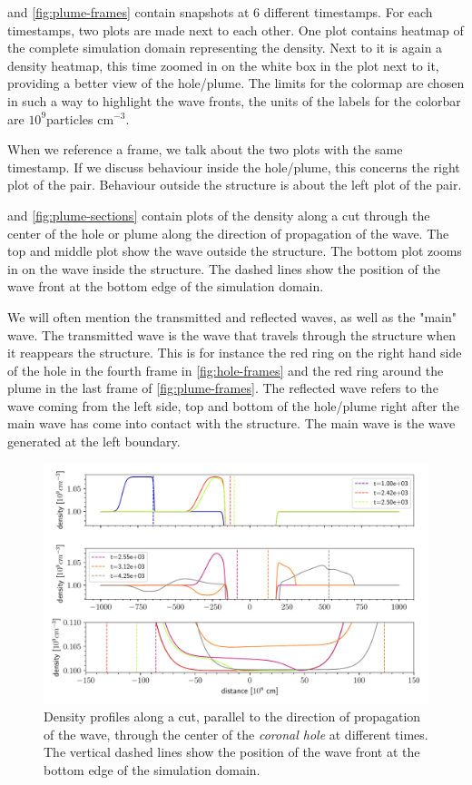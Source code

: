  and \cref{fig:plume-frames} contain snapshots at 6 different timestamps.
For each timestamps, two plots are made next to each other.
One plot contains heatmap of the complete simulation domain representing the density. Next to it is again a density heatmap, this time zoomed in on the white box in the plot next to it, providing a better view of the hole/plume.
The limits for the colormap are chosen in such a way to highlight the wave fronts, the units of the labels for the colorbar are $10^9$particles cm$^{-3}$.

When we reference a frame, we talk about the two plots with the same timestamp. If we discuss behaviour inside the hole/plume, this concerns the right plot of the pair.
Behaviour outside the structure is about the left plot of the pair.

 and \cref{fig:plume-sections} contain plots of the density along a cut through the center of the hole or plume along the direction of propagation of the wave.
The top and middle plot show the wave outside the structure. The bottom plot zooms in on the wave inside the structure.
The dashed lines show the position of the wave front at the bottom edge of the simulation domain.

We will often mention the transmitted and reflected waves, as well as the "main" wave. 
The transmitted wave is the wave that travels through the structure when it reappears the structure.
This is for instance the red ring on the right hand side of the hole in the fourth frame in \cref{fig:hole-frames} and the red ring around the plume in the last frame of \cref{fig:plume-frames}.
The reflected wave refers to the wave coming from the left side, top and bottom of the hole/plume right after the main wave has come into contact with the structure.
The main wave is the wave generated at the left boundary.


\begin{figure}[H]
	\centering
	\includegraphics[width=\linewidth]{images/hole-sections.pdf}
	\caption{Density profiles along a cut, parallel to the direction of propagation of the wave, through the center of the \emph{coronal hole} at different times. The vertical dashed lines show the position of the wave front at the bottom edge of the simulation domain.}
	\label{fig:hole-sections}
\end{figure}

